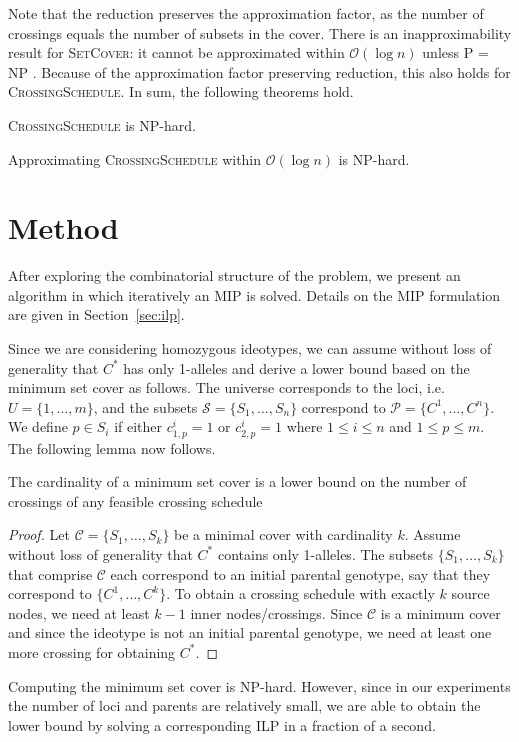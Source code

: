 \documentclass[runningheads]{llncs}
\newcommand{\BigOh}{\ensuremath{\mathcal{O}}}
\begin{document}
Note that the reduction preserves the approximation factor, as the number of crossings equals the number of subsets in the cover. There is an inapproximability result for \textsc{SetCover}: it cannot be approximated within $\BigOh(\log n)$ unless {P = NP} \cite{Raz:1997}. Because of the approximation factor preserving reduction, this also holds for \textsc{CrossingSchedule}. In sum, the following theorems hold.
\begin{theorem}
\textsc{CrossingSchedule} is NP-hard.
\end{theorem}

\begin{theorem}
  Approximating \textsc{CrossingSchedule} within $\BigOh(\log n)$ is NP-hard.
\end{theorem}

\section{Method}\label{sec:method}
After exploring the combinatorial structure of the problem, we present an algorithm in which iteratively an MIP is solved. Details on the MIP formulation are given in Section~\ref{sec:ilp}.

Since we are considering homozygous ideotypes, we can assume without loss of generality that $C^*$ has only 1-alleles and derive a lower bound based on the minimum set cover as follows.
 The universe corresponds to the loci, i.e.\ $U = \{1, \ldots, m\}$, and the subsets $\mathcal{S} = \{S_1, \ldots, S_n\}$ correspond to $\mathcal{P} = \{ C^1, \ldots, C^n \}$. 
We define $p \in S_i$ if either $c^i_{1,p}=1$ or $c^i_{2,p} = 1$ where $1 \leq i \leq n$ and $1 \leq p \leq m$. The following lemma now follows.
\begin{lemma}
\label{lem:lb_crs}
The cardinality of a minimum set cover is a lower bound on the number of crossings of any feasible crossing schedule
\end{lemma}
\begin{proof}
Let $\mathcal{C} = \{S_1,\ldots,S_k\}$ be a minimal cover with cardinality $k$. Assume without loss of generality that $C^*$ contains only 1-alleles.
The subsets $\{S_1, \ldots, S_k\}$ that comprise $\mathcal{C}$ each correspond to an initial parental genotype, say that they correspond to $\{C^1,\ldots,C^k\}$. To obtain a crossing schedule with exactly $k$ source nodes, we need at least $k-1$ inner nodes/crossings. Since $\mathcal{C}$ is a minimum cover and since the ideotype is not an initial parental genotype, we need at least one more crossing for obtaining $C^*$. 
\end{proof}
Computing the minimum set cover is NP-hard. However, since in our experiments the number of loci and parents are relatively small, we are able to obtain the lower bound by solving a corresponding ILP \cite{Wolsey:1998} in a fraction of a second.
\end{document}
